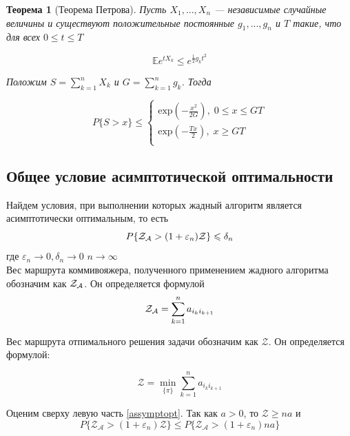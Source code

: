 \documentclass[a4paper, 14pt]{extarticle}
\numberwithin{equation}{section}
\newtheorem{theorem}{Теорема}[section]
\begin{document}
\begin{theorem}[Теорема Петрова]
\label{petrovtheorem}
Пусть $X_1,...,X_n$ — независимые случайные величины и
существуют положительные постоянные $g_1,...,g_n$ и $T$ такие, что для всех $0 \leqslant t \leqslant T$

\begin{equation*}
\mathbb {E}e^{tX_k} \leqslant e^{\frac{1}{2} g_k t^{2}}
\end{equation*}

Положим $S=\sum_{k=1}^{n} X_k $ и $G=\sum_{k=1}^{n} g_k $. Тогда

\begin{equation*}
P\{S > x\} \leqslant 
\begin{cases}
   \mathrm{exp} (-\frac{x^{2}}{2G}), \; 0 \leqslant x \leqslant GT\\[10pt]
   \mathrm{exp} (-\frac{Tx}{2}), \; x\geqslant GT \\
 \end{cases}
\end{equation*}
\end{theorem}


\subsection{Общее условие асимптотической оптимальности}

Найдем условия, при выполнении которых жадный алгоритм является асимптотически оптимальным, то есть
\begin{equation}\label{assymptopt}
P\{\text{$\mathcal{Z_{A}}$} > (1+\varepsilon_n)\mathcal{Z}\}\leqslant \delta_n
\end{equation}
где $\varepsilon_n \rightarrow 0, \delta_n \rightarrow 0$ $n \rightarrow \infty$\\

Вес маршрута коммивояжера, полученного применением жадного алгоритма обозначим как $\text{$\mathcal{Z_{A}}$}$. Он определяется формулой
\begin{equation*}
\text{$\mathcal{Z_{A}}$} = \sum_{k=1}^n a_{i_k i_{k+1}}
\end{equation*}

Вес маршрута отпимального решения задачи обозначим как $\mathcal{Z}$. Он определяется формулой:

\begin{equation*}
\mathcal{Z} = \min_{\{ \pi \}} \sum_{k=1}^n a_{i_k i_{k+1}}
\end{equation*}


Оценим сверху левую часть \eqref{assymptopt}. Так как $a>0$, то $\mathcal{Z} \geqslant na$ и 
\begin{equation}\label{4}
P\{\mathcal{Z_{A}} > (1+\varepsilon_n)\mathcal{Z}\}\leqslant P\{\mathcal{Z_{A}} > (1+\varepsilon_n)na\}
\end{equation}
\end{document}
